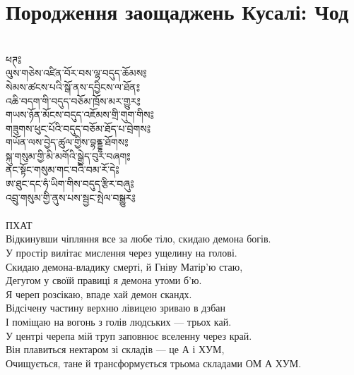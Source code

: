 \ru
\section{Породження заощаджень Кусалі: Чод}
\\
\ti
ཕཊ༔ \\
ལུས་གཅེས་འཛིན་བོར་བས་ལྷ་བདུད་ཆོམས༔\\
སེམས་ཚངས་པའི་སྒོ་ནས་དབྱིངས་ལ་ཐོན༔\\
འཆི་བདག་གི་བདུད་བཅོམ་ཁྲོས་མར་གྱུར༔\\
གཡས་ཉོན་མོངས་བདུད་འཇོམས་གྲི་གུག་གིས༔\\
གཟུགས་ཕུང་པོའི་བདུད་བཅོམ་ཐོད་པ་བྲེགས༔\\
གཡོན་ལས་བྱེད་ཚུལ་གྱིས་བྷནྡྷ་ཐོགས༔\\
སྐུ་གསུམ་གྱི་མི་མགོའི་སྒྱེད་བུར་བཞག༔\\
ནང་སྟོང་གསུམ་གང་བའི་བམ་རོ་དེ༔\\
ཨ་ཐུང་དང་ཧཾ་ཡིག་གིས་བདུད་རྩིར་བཞུ༔\\
འབྲུ་གསུམ་གྱི་ནུས་པས་སྦྱང་སྤེལ་བསྒྱུར༔\\
\\
\ru
ПХАТ\\
Відкинувши чіпляння все за любе тіло, скидаю демона богів.\\
У простір вилітає мислення через ущелину на голові.\\
Скидаю демона-владику смерті, й Гніву Матір'ю стаю,\\
Дегугом у своїй правиці я демона утоми б'ю.\\
Я череп розсікаю, впаде хай демон скандх.\\
Відсічену частину верхню лівицею зриваю в дзбан\\
І поміщаю на вогонь з голів людських --- трьох кай.\\
У центрі черепа мій труп заповнює вселенну через край.\\
Він плавиться нектаром зі складів --- це А і ХУМ,\\
Очищується, тане й трансформується трьома складами ОМ А ХУМ.\\


